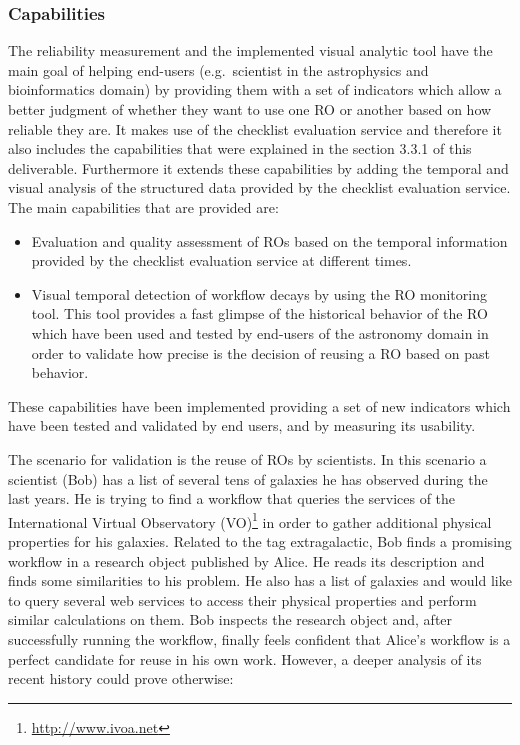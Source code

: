 \subsubsection{Capabilities}

The reliability measurement and the implemented visual analytic tool
have the main goal of helping end-users (e.g.~scientist in the
astrophysics and bioinformatics domain) by providing them with a set of
indicators which allow a better judgment of whether they want to use one
RO or another based on how reliable they are. It makes use of the
checklist evaluation service and therefore it also includes the
capabilities that were explained in the section 3.3.1 of this
deliverable. Furthermore it extends these capabilities by adding the
temporal and visual analysis of the structured data provided by the
checklist evaluation service. The main capabilities that are provided
are:

\begin{itemize}
\itemsep1pt\parskip0pt
\item
  Evaluation and quality assessment of ROs based on the temporal
  information provided by the checklist evaluation service at different
  times.
\item
  Visual temporal detection of workflow decays by using the RO
  monitoring tool. This tool provides a fast glimpse of the historical
  behavior of the RO which have been used and tested by end-users of the
  astronomy domain in order to validate how precise is the decision of
  reusing a RO based on past behavior.
\end{itemize}

These capabilities have been implemented providing a set of new
indicators which have been tested and validated by end users, and by
measuring its usability.

The scenario for validation is the reuse of ROs by scientists. In this
scenario a scientist (Bob) has a list of several tens of galaxies he has
observed during the last years. He is trying to find a workflow that
queries the services of the International Virtual Observatory
(VO)\footnote{\url{http://www.ivoa.net}} in order to gather additional
physical properties for his galaxies. Related to the tag extragalactic,
Bob finds a promising workflow in a research object published by Alice.
He reads its description and finds some similarities to his problem. He
also has a list of galaxies and would like to query several web services
to access their physical properties and perform similar calculations on
them. Bob inspects the research object and, after successfully running
the workflow, finally feels confident that Alice's workflow is a perfect
candidate for reuse in his own work. However, a deeper analysis of its
recent history could prove otherwise:


